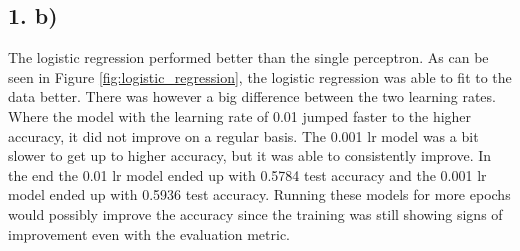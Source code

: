 \documentclass[11pt]{article}
\begin{document}
\subsection{1. b)}
The logistic regression performed better than the single perceptron.
As can be seen in Figure \ref{fig:logistic_regression}, the logistic regression was able to fit to the data better.
There was however a big difference between the two learning rates.
Where the model with the learning rate of 0.01 jumped faster to the higher accuracy, it did not improve on a regular basis.
The 0.001 lr model was a bit slower to get up to higher accuracy, but it was able to consistently improve.
In the end the 0.01 lr model ended up with 0.5784 test accuracy and the 0.001 lr model ended up with 0.5936 test accuracy.
Running these models for more epochs would possibly improve the accuracy since the training was still showing signs of improvement even with the evaluation metric.
\end{document}
